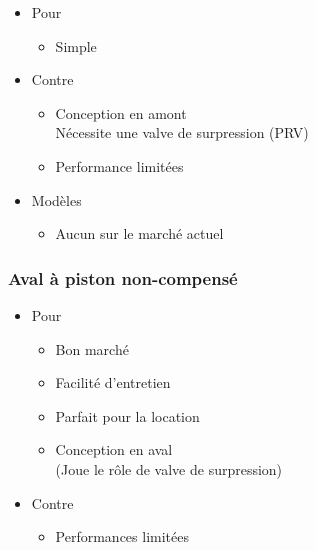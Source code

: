 \documentclass[aspectratio=1610,english,12pt]{beamer}
\begin{document}
\begin{frame}{\insertsubsubsection}
	\begin{itemize}
		\item Pour
		\begin{itemize}
			\item Simple
		\end{itemize}
		\item Contre
		\begin{itemize}
			\item Conception en amont \\ Nécessite une valve de surpression (PRV)
			\item Performance limitées
		\end{itemize}
	\end{itemize}
\end{frame}

\begin{frame}{\insertsubsubsection}
	\begin{itemize}
		\item Modèles
		\begin{itemize}
			\item Aucun sur le marché actuel
		\end{itemize}
	\end{itemize}
\end{frame}


\subsubsection{Aval à piston non-compensé}
\begin{frame}{\insertsubsubsection}
\end{frame}

\begin{frame}{\insertsubsubsection}
	\begin{itemize}
		\item Pour
		\begin{itemize}
			\item Bon marché
			\item Facilité d'entretien
			\item Parfait pour la location
			\item Conception en aval \\ (Joue le rôle de valve de surpression)
		\end{itemize}
		\item Contre
		\begin{itemize}
			\item Performances limitées
		\end{itemize}
	\end{itemize}
\end{frame}
\end{document}
